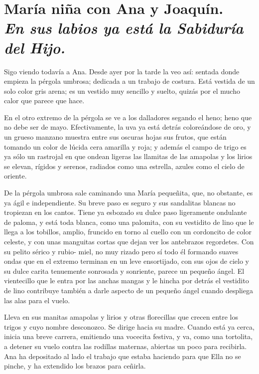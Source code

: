 \documentclass[12pt]{book} %
\begin{document}
\chapter*{María niña con Ana y Joaquín. \\ \normalfont\normalsize\textit{En sus labios ya está la Sabiduría del Hijo.}}
 
Sigo viendo todavía a Ana. Desde ayer por la tarde la veo así: sentada donde empieza la pérgola umbrosa; dedicada a un trabajo de costura. Está vestida de un solo color gris arena; es un vestido muy sencillo y suelto, quizás por el mucho calor que parece que hace. 

En el otro extremo de la pérgola se ve a los dalladores segando el heno; heno que no debe ser de mayo. Efectivamente, la uva ya está detrás coloreándose de oro, y un grueso manzano muestra entre sus oscuras hojas sus frutos, que están tomando un color de lúcida cera amarilla y roja; y además el campo de trigo es ya sólo un rastrojal en que ondean ligeras las llamitas de las amapolas y los lirios se elevan, rígidos y serenos, radiados como una estrella, azules como el cielo de oriente. 

De la pérgola umbrosa sale caminando una María pequeñita, que, no obstante, es ya ágil e independiente. Su breve paso es seguro y sus sandalitas blancas no tropiezan en los cantos. Tiene ya esbozado su dulce paso ligeramente ondulante de paloma, y está toda blanca, como una palomita, con su vestidito de lino que le llega a los tobillos, amplio, fruncido en torno al cuello con un cordoncito de color celeste, y con unas manguitas cortas que dejan ver los antebrazos regordetes. Con su pelito sérico y rubio- miel, no muy rizado pero sí todo él formando suaves ondas que en el extremo terminan en un leve ensortijado, con sus ojos de cielo y su dulce carita tenuemente sonrosada y sonriente, parece un pequeño ángel. El vientecillo que le entra por las anchas mangas y le hincha por detrás el vestidito de lino contribuye también a darle aspecto de un pequeño ángel cuando despliega las alas para el vuelo. 

Lleva en sus manitas amapolas y lirios y otras florecillas que crecen entre los trigos y cuyo nombre desconozco. Se dirige hacia su madre. Cuando está ya cerca, inicia una breve carrera, emitiendo una vocecita festiva, y va, como una tortolita, a detener su vuelo contra las rodillas maternas, abiertas un poco para recibirla. Ana ha depositado al lado el trabajo que estaba haciendo para que Ella no se pinche, y ha extendido los brazos para ceñirla. 
\end{document}
